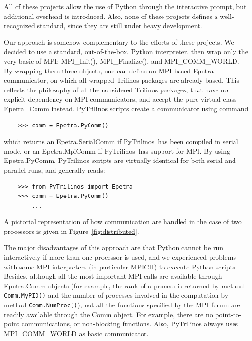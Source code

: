 \documentclass[10pt,relax]{SANDreport}
\newcommand{\PyTrilinos}{{PyTrilinos}}
\begin{document}
All of these projects allow the use of Python through the
interactive prompt,
  but additional overhead is introduced. Also, none of these projects
  defines a well-recognized standard, since they are still under heavy
  development.

Our approach is somehow complementary to the efforts of these projects.
We decided to use a standard, out-of-the-box, Python interpreter, then wrap
only the very basic of MPI:
MPI\_Init(), MPI\_Finalize(), and MPI\_COMM\_WORLD. By wrapping these three
objects, one can define an MPI-based Epetra communicator, on which
all wrapped Trilinos packages are already
based. This reflects the philosophy of all the
considered
Trilinos packages, that have no explicit dependency on MPI communicators, and
accept the pure virtual class Epetra\_Comm instead. PyTrilinos scripts create
a communicator using command
\begin{verbatim}
    >>> comm = Epetra.PyComm()
\end{verbatim}
which returns an Epetra.SerialComm if \PyTrilinos\ has been compiled
in serial mode, or an Epetra.MpiComm if \PyTrilinos\ has support for
MPI. By using Epetra.PyComm, \PyTrilinos\ scripts are virtually
identical for both serial and parallel runs, and generally reads:
\begin{verbatim}
    >>> from PyTrilinos import Epetra
    >>> comm = Epetra.PyComm()
        ...
\end{verbatim}
A pictorial representation of how communication are handled in
the case of two  processors is given in Figure~\ref{fig:distributed}. 

\smallskip

The major disadvantages of this approach are that Python cannot be run
interactively if more than one processor is used, and we experienced problems
with some MPI interpreters (in particular MPICH) to execute Python scripts.
Besides, although all the most important MPI calls are available through
Epetra.Comm objects (for example, the rank of a process is returned by method
                     {\tt Comm.MyPID()} and the number of processes involved in
                     the computation by method {\tt Comm.NumProc()}), not all
the functions specified by the MPI forum are readily available through the
Comm object.  For example, there are no point-to-point communications, or
non-blocking functions. Also, PyTrilinos always uses MPI\_COMM\_WORLD as basic
communicator.
\end{document}
